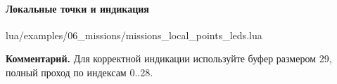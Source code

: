 \paragraph{Локальные точки и индикация}
\begin{codefile}{lua/examples/06_missions/missions_local_points_leds.lua}
\end{codefile}
\textbf{Комментарий.} Для корректной индикации используйте буфер размером 29, полный проход по индексам 0..28.
